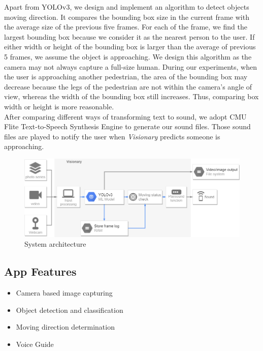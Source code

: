 \documentclass[letterpaper]{article} %
\begin{document}
\noindent Apart from YOLOv3, we design and implement an algorithm to detect objects moving direction. It compares the bounding box size in the current frame with the average size of the previous five frames. For each of the frame, we find the largest bounding box because we consider it as the nearest person to the user. If either width or height of the bounding box is larger than the average of previous 5 frames, we assume the object is approaching. We design this algorithm as the camera may not always capture a full-size human. During our experiments, when the user is approaching another pedestrian, the area of the bounding box may decrease because the legs of the pedestrian are not within the camera's angle of view, whereas the width of the bounding box still increases. Thus, comparing box width or height is more reasonable. \\

\noindent After comparing different ways of transforming text to sound, we adopt CMU Flite Text-to-Speech Synthesis Engine to generate our sound files. Those sound files are played to notify the user when \textit{Visionary} predicts someone is approaching. 
\begin{figure}[ht]
\hspace{-6mm}
\centering
\includegraphics[width=1.1\linewidth,height = 0.4\linewidth]{Figure/Code_structure_diagram.png}
\caption{\footnotesize{System architecture}}
\label{fig:arc}
\vspace{-2mm}
\end{figure}

\subsection{App Features}
\begin{itemize}
\item Camera based image capturing
\item Object detection and classification
\item Moving direction determination
\item Voice Guide
\end{itemize}
\end{document}
